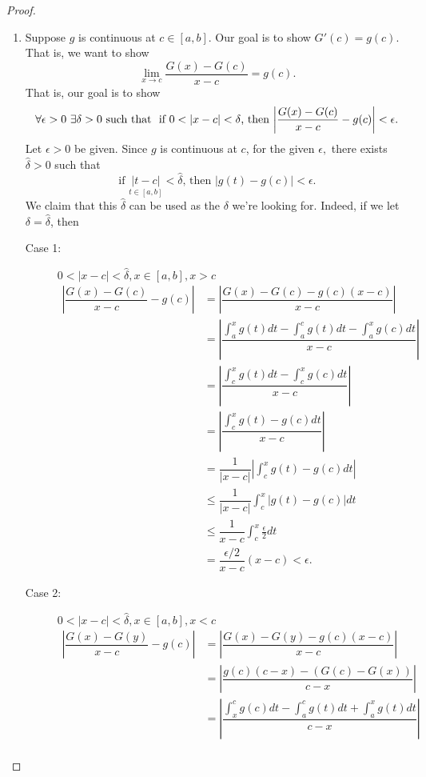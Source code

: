 \begin{proof}
\begin{enumerate}
\begin{enumerate}
            \item[(2)] Suppose $g$ is continuous at $c \in [a,b]$. Our goal is to show $G'(c) = g(c).$ That is, we want to show 
            $$\lim_{x \to c} \dfrac{G(x) - G(c)}{x -c} = g(c).$$
            That is, our goal is to show
            $$\forall \epsilon > 0 ~\exists \delta > 0 \text{ such that } \text{ if $0 < |x-c| < \delta$, then $\left|\dfrac{G(x) - G(c)}{x-c}-g(c)\right| < \epsilon.$}$$
            Let $\epsilon > 0$ be given. Since $g$ is continuous at $c$, for the given $\epsilon,$ there exists $\hat{\delta} > 0$ such that 
            $$\text{if $\underset{{t\in [a,b]}}{|t-c|} < \hat{\delta}$, then $|g(t) - g(c)| < \epsilon$.}$$
            We claim that this $\hat{\delta}$ can be used as the $\delta$ we're looking for. Indeed, if we let $\delta = \hat{\delta}$, then 
            \begin{description}
                \item[Case 1: ] $0 < |x-c| < \hat{\delta}, x \in [a,b], x > c$
                \begin{align*}
                    \left|\dfrac{G(x) - G(c)}{x-c} - g(c)\right| &= \left|\dfrac{G(x)- G(c)-g(c)(x-c)}{x-c}\right| \\ 
                    &= \left|\dfrac{\int_a^x g(t)dt - \int_a^c g(t) dt - \int_a^x g(c)dt}{x-c}\right| \\
                    &= \left|\dfrac{\int_c^x g(t)dt - \int_c^x g(c) dt}{x-c}\right| \\
                    &= \left|\dfrac{\int_c^x g(t) - g(c)dt}{x-c}\right| \\ 
                    &= \dfrac{1}{|x-c|} \left|\int_c^x g(t) - g(c) dt\right| \\
                    &\leq \dfrac{1}{|x-c|} \int_c^x |g(t) - g(c)|dt \\
                    &\leq \dfrac{1}{x-c} \int_c^x \frac{\epsilon}{2}dt \\
                    &= \dfrac{\epsilon / 2}{x-c} (x-c) < \epsilon.
                \end{align*}
                \item[Case 2: ] $0 < |x-c| < \hat{\delta}, x \in [a,b], x < c$
                \begin{align*}
                    \left|\dfrac{G(x) - G(y)}{x-c} - g(c)\right| &= \left|\dfrac{G(x) - G(y) - g(c)(x-c)}{x-c}\right| \\ 
                    &= \left|\dfrac{g(c)(c-x) - (G(c) - G(x))}{c-x}\right| \\ 
                    &= \left|\dfrac{\int_x^c g(c)dt - \int_a^c g(t)dt + \int_a^x g(t)dt}{c-x}\right| \\

\end{align*}
\end{description}
\end{enumerate}
\end{enumerate}
\end{proof}
